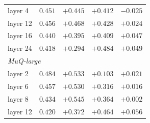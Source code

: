 \begin{table}[t]
\begin{tabular}{l r r r r}
\quad layer 4 & $0.451$ & $+0.445$ & $+0.412$ & $-0.025$ \\
\quad layer 12 & $0.456$ & $+0.468$ & $+0.428$ & $+0.024$ \\
\quad layer 16 & $0.440$ & $+0.395$ & $+0.409$ & $+0.047$ \\
\quad layer 24 & $0.418$ & $+0.294$ & $+0.484$ & $+0.049$ \\
\multicolumn{5}{l}{\textit{MuQ-large}} \\
\quad layer 2 & $0.484$ & $+0.533$ & \textcolor{lo}{$\mathbf{+0.103}$} & $+0.021$ \\
\quad layer 6 & $0.457$ & $+0.530$ & $+0.316$ & $+0.016$ \\
\quad layer 8 & $0.434$ & $+0.545$ & $+0.364$ & $+0.002$ \\
\quad layer 12 & $0.420$ & $+0.372$ & $+0.464$ & $+0.056$ \\
\bottomrule
\end{tabular}
\end{table}
